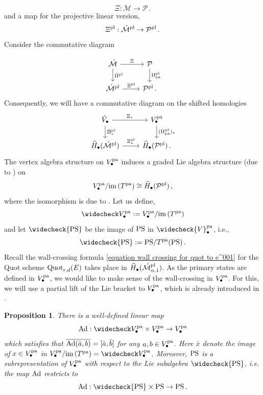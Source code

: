 \documentclass[11pt]{amsart}
\newtheorem{proposition}[theorem]{Proposition}
\theoremstyle{remark}
\renewcommand{\P}{\mathcal{P}}
\newcommand{\Mdash}{\acute{\mathcal{M}}}
\newcommand{\Pidash}{\acute{\Pi}}
\newcommand{\im}{\textnormal{im}\,}
\newcommand{\wh}[1]{\widehat{#1}}
\newcommand{\quot}[0]{\textnormal{Quot}}
\newcommand{\pa}[0]{\textnormal{pa}}
\newcommand{\pl}[0]{\textnormal{pl}}
\newcommand{\ad}[0]{\textnormal{Ad}}
\newcommand{\PS}{\textnormal{PS}}
\numberwithin{theorem}{section}
\begin{document}
$$ \Xi :\Mdash \to \P\,.$$
and a map for the projective linear version,
$$ \Xi^\pl :\Mdash^\pl \to \P^\pl\,.$$
Consider the commutative diagram

$$
    \begin{tikzcd}
    \Mdash \arrow[r,"\Xi"] \arrow[d,"\Pidash^\pl"] & \P \arrow[d,"\Pi^\pl_\pa"]\\   
    \Mdash^\pl \arrow[r,"\Xi^\pl"]& \P^\pl \,.
\end{tikzcd}
$$
Consequently, we will have a commutative diagram on the shifted homologies
$$
\begin{tikzcd}
    \acute V_\bullet \arrow[r,"{\Xi}_*"] \arrow[d,"\Pidash^\pl_*"] & V^\pa_\bullet \arrow[d,"(\Pi^\pl_\pa)_*"]\\   
    \wh{H}_\bullet(\Mdash^\pl) \arrow[r,"\Xi^\pl_*"]& \wh{H}_\bullet(\P^\pl) \,.
\end{tikzcd}
$$
The vertex algebra structure on $V_\bullet^\pa$ induces 
a graded Lie algebra structure (due to \cite{Bor86})
on 
$$V^\pa_{\bullet}/\im (T^\pa) \cong \wh{H}_\bullet(\P^\pl)\,,$$
where the isomorphism is due to \cite[Theorem 4.8]{Joy21}.
Let us define,
$$\widecheck V^\pa_\bullet := V^\pa_{\bullet}/\im (T^\pa)$$
and let $\widecheck{\PS}$ be the image of $\PS$ in $\widecheck{V}^\pa_\bullet$, i.e.,
$$\widecheck{\PS}:= \PS/T^\pa(\PS)\,.$$
    Recall the wall-crossing formula 
    \eqref{equation wall crossing for quot to e^001} 
    for the Quot scheme $\quot_{r,d}(E)$  takes place in 
    $\wh{H}_\bullet(\Mdash_{\alpha,1}^\pl)$.
    As the primary states are defined in $V^\pa_\bullet$, 
    we would like to make sense of the wall-crossing in $V^\pa_\bullet$.
    For this, we will use a partial lift of the Lie bracket to $V^\pa_\bullet$, which is already introduced in \cite{BLM24}.
    \begin{proposition}\label{proposition lifting bracket}
        There is a well-defined linear map 
        $$ \ad: \widecheck V^\pa_\bullet \times V^\pa_\bullet \to V^\pa_\bullet$$
        which satisfies that $\overline{\ad(\bar{a},b)}= [\bar{a},\bar{b}]$ for any $a,b \in V^\pa_\bullet$.
        Here $\bar{x}$ denote 
        the image of $x \in V^\pa_\bullet$ in
        $V^\pa_\bullet/\im(T^\pa) = \widecheck V^\pa_\bullet$.
        Moreover, $\PS$ is a subrepresentation of $V^\pa_\bullet$ with respect to the Lie  subalgebra $\widecheck{\PS}$, i.e. the map $\ad$ restricts to
        $$ \ad : \widecheck{\PS} \times \PS \to \PS\,.$$
    \end{proposition}
\end{document}
